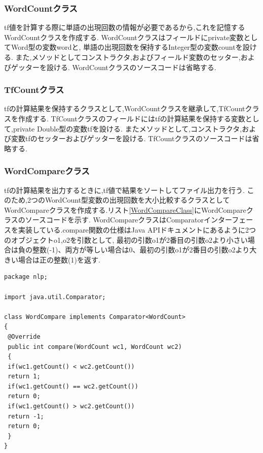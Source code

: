 \documentclass[a4j]{jarticle}
\begin{document}
\subsubsection{WordCountクラス}
tf値を計算する際に単語の出現回数の情報が必要であるから,これを記憶するWordCountクラスを作成する.
WordCountクラスはフィールドにprivate変数としてWord型の変数wordと,
単語の出現回数を保持するInteger型の変数countを設ける.
また,メソッドとしてコンストラクタ,およびフィールド変数のセッター,およびゲッターを設ける.
WordCountクラスのソースコードは省略する.


\subsubsection{TfCountクラス}
tfの計算結果を保持するクラスとして,WordCountクラスを継承して,TfCountクラスを作成する.
TfCountクラスのフィールドにはtfの計算結果を保持する変数として,private Double型の変数tfを設ける.
またメソッドとして,コンストラクタ,および変数tfのセッターおよびゲッターを設ける.
TfCountクラスのソースコードは省略する.

\subsubsection{WordCompareクラス}
tfの計算結果を出力するときに,tf値で結果をソートしてファイル出力を行う.
このため,2つのWordCount型変数の出現回数を大小比較するクラスとしてWordCompareクラスを作成する.リスト\ref{WordCompareClass}にWordCompareクラスのソースコードを示す.
WordCompareクラスはComparatorインターフェースを実装している.compare関数の仕様はJava APIドキュメント\cite{javaapi}にあるように2つのオブジェクトo1,o2を引数として,
最初の引数o1が2番目の引数o2より小さい場合は負の整数(-1)、両方が等しい場合は0、最初の引数o1が2番目の引数o2より大きい場合は正の整数(1)を返す.
\begin{lstlisting}[basicstyle=\ttfamily\footnotesize, frame=single,label=WordCompareClass,caption=WordCompareクラスのソースコード]
package nlp;

import java.util.Comparator;

class WordCompare implements Comparator<WordCount>
{
 @Override
 public int compare(WordCount wc1, WordCount wc2)
 {
 if(wc1.getCount() < wc2.getCount())
 return 1;
 if(wc1.getCount() == wc2.getCount())
 return 0;
 if(wc1.getCount() > wc2.getCount())
 return -1;
 return 0;
 }
}
    \end{lstlisting}
\end{document}
